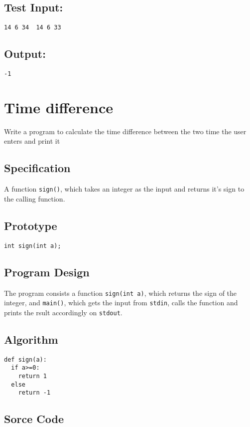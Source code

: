 \documentclass[11pt]{article}
\begin{document}
\subsection*{Test Input:}
\label{sec-2-4}
\begin{verbatim}
14 6 34  14 6 33
\end{verbatim}
\subsection*{Output:}
\label{sec-2-5}
\begin{verbatim}
-1          
\end{verbatim}

\section{Time difference}
\label{sec-3}
Write a program to calculate the time difference between the two 
time the user enters and print it
\subsection*{Specification}
\label{sec-3-1}
A function \texttt{sign()}, which takes an integer as the input and returns
it's sign to the calling function.
\subsection*{Prototype}
\label{sec-3-2}
\begin{verbatim}
int sign(int a);
\end{verbatim}
\subsection*{Program Design}
\label{sec-3-3}
The program consists a function \texttt{sign(int a)}, which returns the 
sign of the integer, and \texttt{main()}, which gets the input from \texttt{stdin},
calls the function and prints the rsult accordingly on \texttt{stdout}.
\subsection*{Algorithm}
\label{sec-3-4}
\begin{verbatim}
def sign(a):
  if a>=0:
    return 1
  else
    return -1
\end{verbatim}
\subsection*{Sorce Code}
\label{sec-3-5}
\end{document}
